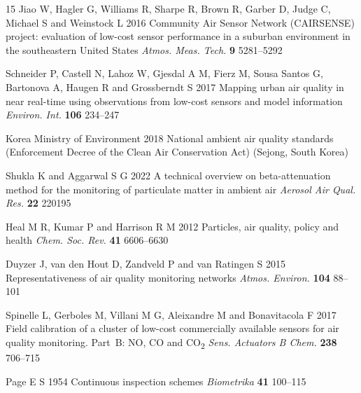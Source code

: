 \documentclass[12pt]{article}
\begin{document}
\begin{thebibliography}{15}
Jiao W, Hagler G, Williams R, Sharpe R, Brown R, Garber D, Judge C, Michael S and Weinstock L 2016 Community Air Sensor Network (CAIRSENSE) project: evaluation of low-cost sensor performance in a suburban environment in the southeastern United States \textit{Atmos. Meas. Tech.} \textbf{9} 5281--5292

Schneider P, Castell N, Lahoz W, Gjesdal A M, Fierz M, Sousa Santos G, Bartonova A, Haugen R and Grossberndt S 2017 Mapping urban air quality in near real-time using observations from low-cost sensors and model information \textit{Environ. Int.} \textbf{106} 234--247

Korea Ministry of Environment 2018 National ambient air quality standards (Enforcement Decree of the Clean Air Conservation Act) (Sejong, South Korea)

Shukla K and Aggarwal S G 2022 A technical overview on beta-attenuation method for the monitoring of particulate matter in ambient air \textit{Aerosol Air Qual. Res.} \textbf{22} 220195

Heal M R, Kumar P and Harrison R M 2012 Particles, air quality, policy and health \textit{Chem. Soc. Rev.} \textbf{41} 6606--6630

Duyzer J, van den Hout D, Zandveld P and van Ratingen S 2015 Representativeness of air quality monitoring networks \textit{Atmos. Environ.} \textbf{104} 88--101

Spinelle L, Gerboles M, Villani M G, Aleixandre M and Bonavitacola F 2017 Field calibration of a cluster of low-cost commercially available sensors for air quality monitoring. Part~B: NO, CO and CO\textsubscript{2} \textit{Sens. Actuators B Chem.} \textbf{238} 706--715

Page E S 1954 Continuous inspection schemes \textit{Biometrika} \textbf{41} 100--115

\end{thebibliography}
\end{document}
